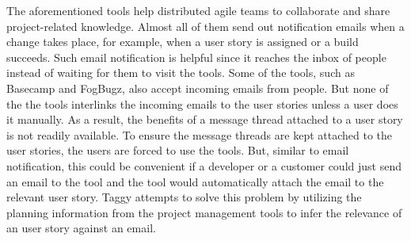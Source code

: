 The aforementioned tools help distributed agile teams to collaborate and share project-related knowledge. Almost all of them send out notification emails when a change takes place, for example, when a user story is assigned or a build succeeds. Such email notification is helpful since it reaches the inbox of people instead of waiting for them to visit the tools. Some of the tools, such as Basecamp and FogBugz, also accept incoming emails from people. But none of the the tools interlinks the incoming emails to the user stories unless a user does it manually. As a result, the benefits of a message thread attached to a user story is not readily available. To ensure the message threads are kept attached to the user stories, the users are forced to use the tools. But, similar to email notification, this could be convenient if a developer or a customer could just send an email to the tool and the tool would automatically attach the email to the relevant user story. Taggy attempts to solve this problem by utilizing the planning information from the project management tools to infer the relevance of an user story against an email.